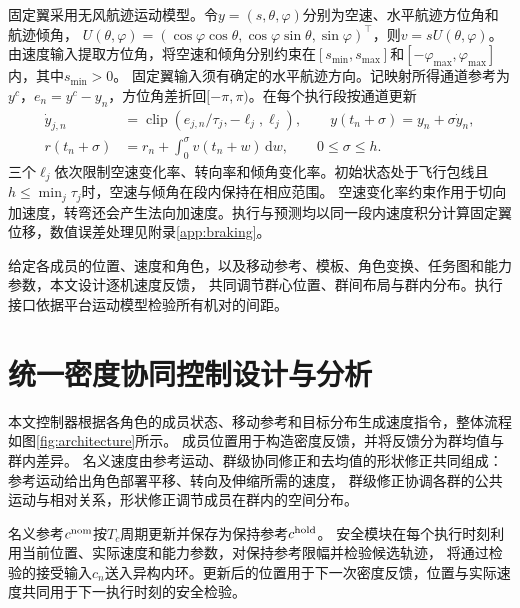 \documentclass[UTF8,a4paper,11pt,fontset=none]{ctexart}
\begin{document}
固定翼采用无风航迹运动模型。令$y=(s,\theta,\varphi)$分别为空速、水平航迹方位角和航迹倾角，
$U(\theta,\varphi)=(\cos\varphi\cos\theta,\cos\varphi\sin\theta,\sin\varphi)^\top$，则$v=sU(\theta,\varphi)$。
由速度输入提取方位角，将空速和倾角分别约束在$[s_{\min},s_{\max}]$和$[-\varphi_{\max},\varphi_{\max}]$内，其中$s_{\min}>0$。
固定翼输入须有确定的水平航迹方向。记映射所得通道参考为$y^c$，$e_n=y^c-y_n$，方位角差折回$[-\pi,\pi)$。在每个执行段按通道更新
\begin{equation}
\begin{aligned}
\dot y_{j,n}&=\operatorname{clip}\!\left(e_{j,n}/\tau_j,-\ell_j,\ell_j\right),\qquad
y(t_n+\sigma)=y_n+\sigma\dot y_n,\\
r(t_n+\sigma)&=r_n+\int_0^\sigma v(t_n+w)\,\mathrm dw,\qquad 0\le\sigma\le h .
\end{aligned}
\label{eq:fw-step}
\end{equation}
三个$\ell_j$依次限制空速变化率、转向率和倾角变化率。初始状态处于飞行包线且$h\le\min_j\tau_j$时，空速与倾角在段内保持在相应范围。
空速变化率约束作用于切向加速度，转弯还会产生法向加速度。执行与预测均以同一段内速度积分计算固定翼位移，数值误差处理见附录\ref{app:braking}。

给定各成员的位置、速度和角色，以及移动参考、模板、角色变换、任务图和能力参数，本文设计逐机速度反馈，
共同调节群心位置、群间布局与群内分布。执行接口依据平台运动模型检验所有机对的间距。

\section{统一密度协同控制设计与分析}\label{sec:control}
本文控制器根据各角色的成员状态、移动参考和目标分布生成速度指令，整体流程如图\ref{fig:architecture}所示。
成员位置用于构造密度反馈，并将反馈分为群均值与群内差异。
名义速度由参考运动、群级协同修正和去均值的形状修正共同组成：参考运动给出角色部署平移、转向及伸缩所需的速度，
群级修正协调各群的公共运动与相对关系，形状修正调节成员在群内的空间分布。

名义参考$c^{\rm nom}$按$T_c$周期更新并保存为保持参考$c^{\rm hold}$。
安全模块在每个执行时刻利用当前位置、实际速度和能力参数，对保持参考限幅并检验候选轨迹，
将通过检验的接受输入$c_n$送入异构内环。更新后的位置用于下一次密度反馈，位置与实际速度共同用于下一执行时刻的安全检验。
\end{document}
